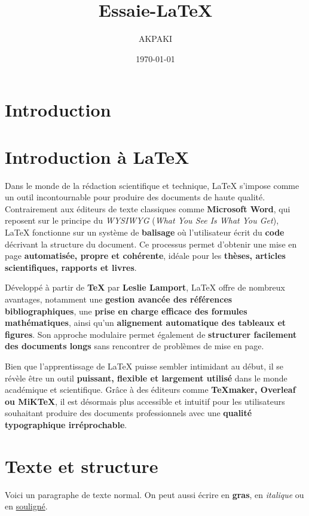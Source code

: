 \documentclass[a4paper,12pt]{article} %
\title{Essaie-LaTeX}
\author{AKPAKI}
\date{\today}
\begin{document}
\maketitle %

\section{Introduction}

\section*{Introduction à \LaTeX} %

Dans le monde de la rédaction scientifique et technique, \LaTeX{} s’impose comme un outil incontournable pour produire des documents de haute qualité. Contrairement aux éditeurs de texte classiques comme \textbf{Microsoft Word}, qui reposent sur le principe du \textit{WYSIWYG} (\textit{What You See Is What You Get}), \LaTeX{} fonctionne sur un système de \textbf{balisage} où l’utilisateur écrit du \textbf{code} décrivant la structure du document. Ce processus permet d’obtenir une mise en page \textbf{automatisée, propre et cohérente}, idéale pour les \textbf{thèses, articles scientifiques, rapports et livres}.  

Développé à partir de \textbf{TeX} par \textbf{Leslie Lamport}, \LaTeX{} offre de nombreux avantages, notamment une \textbf{gestion avancée des références bibliographiques}, une \textbf{prise en charge efficace des formules mathématiques}, ainsi qu’un \textbf{alignement automatique des tableaux et figures}. Son approche modulaire permet également de \textbf{structurer facilement des documents longs} sans rencontrer de problèmes de mise en page.  

Bien que l’apprentissage de \LaTeX{} puisse sembler intimidant au début, il se révèle être un outil \textbf{puissant, flexible et largement utilisé} dans le monde académique et scientifique. Grâce à des éditeurs comme \textbf{TeXmaker, Overleaf ou MiKTeX}, il est désormais plus accessible et intuitif pour les utilisateurs souhaitant produire des documents professionnels avec une \textbf{qualité typographique irréprochable}.  


\section{Texte et structure}
Voici un paragraphe de texte normal.  
On peut aussi écrire en \textbf{gras}, en \textit{italique} ou en \underline{souligné}.  
\end{document}
